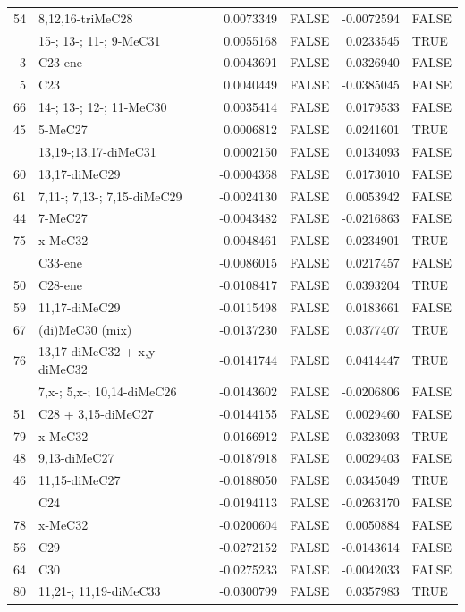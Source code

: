 \documentclass[
]{article}
\begin{document}
\begin{longtable}[t]{rlrlrl}
54 & 8,12,16-triMeC28 & 0.0073349 & FALSE & -0.0072594 & FALSE\\
\addlinespace
70 & 15-; 13-; 11-; 9-MeC31 & 0.0055168 & FALSE & 0.0233545 & TRUE\\
3 & C23-ene & 0.0043691 & FALSE & -0.0326940 & FALSE\\
5 & C23 & 0.0040449 & FALSE & -0.0385045 & FALSE\\
66 & 14-; 13-; 12-; 11-MeC30 & 0.0035414 & FALSE & 0.0179533 & FALSE\\
45 & 5-MeC27 & 0.0006812 & FALSE & 0.0241601 & TRUE\\
\addlinespace
72 & 13,19-;13,17-diMeC31 & 0.0002150 & FALSE & 0.0134093 & FALSE\\
60 & 13,17-diMeC29 & -0.0004368 & FALSE & 0.0173010 & FALSE\\
61 & 7,11-; 7,13-; 7,15-diMeC29 & -0.0024130 & FALSE & 0.0053942 & FALSE\\
44 & 7-MeC27 & -0.0043482 & FALSE & -0.0216863 & FALSE\\
75 & x-MeC32 & -0.0048461 & FALSE & 0.0234901 & TRUE\\
\addlinespace
77 & C33-ene & -0.0086015 & FALSE & 0.0217457 & FALSE\\
50 & C28-ene & -0.0108417 & FALSE & 0.0393204 & TRUE\\
59 & 11,17-diMeC29 & -0.0115498 & FALSE & 0.0183661 & FALSE\\
67 & (di)MeC30 (mix) & -0.0137230 & FALSE & 0.0377407 & TRUE\\
76 & 13,17-diMeC32 + x,y-diMeC32 & -0.0141744 & FALSE & 0.0414447 & TRUE\\
\addlinespace
37 & 7,x-; 5,x-; 10,14-diMeC26 & -0.0143602 & FALSE & -0.0206806 & FALSE\\
51 & C28 + 3,15-diMeC27 & -0.0144155 & FALSE & 0.0029460 & FALSE\\
79 & x-MeC32 & -0.0166912 & FALSE & 0.0323093 & TRUE\\
48 & 9,13-diMeC27 & -0.0187918 & FALSE & 0.0029403 & FALSE\\
46 & 11,15-diMeC27 & -0.0188050 & FALSE & 0.0345049 & TRUE\\
\addlinespace
11 & C24 & -0.0194113 & FALSE & -0.0263170 & FALSE\\
78 & x-MeC32 & -0.0200604 & FALSE & 0.0050884 & FALSE\\
56 & C29 & -0.0272152 & FALSE & -0.0143614 & FALSE\\
64 & C30 & -0.0275233 & FALSE & -0.0042033 & FALSE\\
80 & 11,21-; 11,19-diMeC33 & -0.0300799 & FALSE & 0.0357983 & TRUE\\

\end{longtable}
\end{document}
